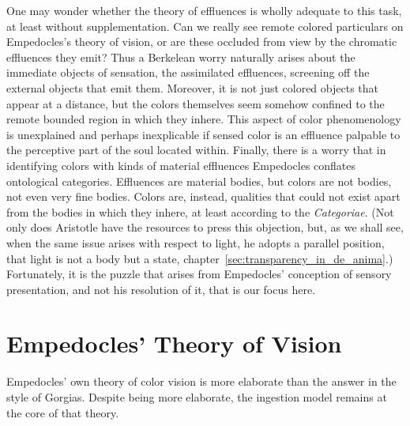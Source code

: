 One may wonder whether the theory of effluences is wholly adequate to this task, at least without supplementation. Can we really see remote colored particulars on Empedocles's theory of vision, or are these occluded from view by the chromatic effluences they emit? Thus a Berkelean worry naturally arises about the immediate objects of sensation, the assimilated effluences, screening off the external objects that emit them. Moreover, it is not just colored objects that appear at a distance, but the colors themselves seem somehow confined to the remote bounded region in which they inhere. This aspect of color phenomenology is unexplained and perhaps inexplicable if sensed color is an effluence palpable to the perceptive part of the soul located within. Finally, there is a worry that in identifying colors with kinds of material effluences Empedocles conflates ontological categories. Effluences are material bodies, but colors are not bodies, not even very fine bodies. Colors are, instead, qualities that could not exist apart from the bodies in which they inhere, at least according to the \emph{Categoriae}. (Not only does Aristotle have the resources to press this objection, but, as we shall see, when the same issue arises with respect to light, he adopts a parallel position, that light is not a body but a state, chapter~\ref{sec:transparency_in_de_anima}.) Fortunately, it is the puzzle that arises from Empedocles' conception of sensory presentation, and not his resolution of it, that is our focus here.


\section{Empedocles' Theory of Vision} %
\label{sec:empedocles_theory_of_vision}

Empedocles' own theory of color vision is more elaborate than the answer in the style of Gorgias. Despite being more elaborate, the ingestion model remains at the core of that theory. 

